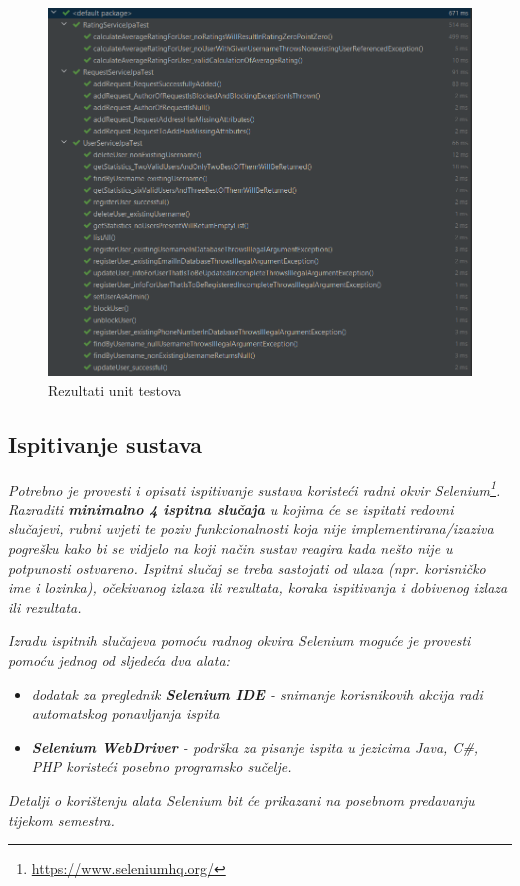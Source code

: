 			\bigskip
			\begin{figure}[H]
				\includegraphics[scale=0.8]{slike/unit_testovi.png}
				\centering
				\caption{Rezultati unit testova}
				
			\end{figure}
			
			
			\subsection{Ispitivanje sustava}
			
			 \textit{Potrebno je provesti i opisati ispitivanje sustava koristeći radni okvir Selenium\footnote{\url{https://www.seleniumhq.org/}}. Razraditi \textbf{minimalno 4 ispitna slučaja} u kojima će se ispitati redovni slučajevi, rubni uvjeti te poziv funkcionalnosti koja nije implementirana/izaziva pogrešku kako bi se vidjelo na koji način sustav reagira kada nešto nije u potpunosti ostvareno. Ispitni slučaj se treba sastojati od ulaza (npr. korisničko ime i lozinka), očekivanog izlaza ili rezultata, koraka ispitivanja i dobivenog izlaza ili rezultata.\\ }
			 
			 \textit{Izradu ispitnih slučajeva pomoću radnog okvira Selenium moguće je provesti pomoću jednog od sljedeća dva alata:}
			 \begin{itemize}
			 	\item \textit{dodatak za preglednik \textbf{Selenium IDE} - snimanje korisnikovih akcija radi automatskog ponavljanja ispita	}
			 	\item \textit{\textbf{Selenium WebDriver} - podrška za pisanje ispita u jezicima Java, C\#, PHP koristeći posebno programsko sučelje.}
			 \end{itemize}
		 	\textit{Detalji o korištenju alata Selenium bit će prikazani na posebnom predavanju tijekom semestra.}
			

